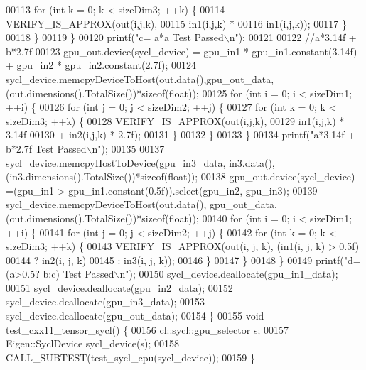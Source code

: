 \begin{DoxyCode}
00113       \textcolor{keywordflow}{for} (\textcolor{keywordtype}{int} k = 0; k < sizeDim3; ++k) \{
00114         VERIFY\_IS\_APPROX(out(i,j,k),
00115                          in1(i,j,k) *
00116                              in1(i,j,k));
00117       \}
00118     \}
00119   \}
00120   printf(\textcolor{stringliteral}{"c= a*a Test Passed\(\backslash\)n"});
00121 
00122   \textcolor{comment}{//a*3.14f + b*2.7f}
00123   gpu\_out.device(sycl\_device) =  gpu\_in1 * gpu\_in1.constant(3.14f) + gpu\_in2 * gpu\_in2.constant(2.7f);
00124   sycl\_device.memcpyDeviceToHost(out.data(),gpu\_out\_data,(out.dimensions().TotalSize())*\textcolor{keyword}{sizeof}(\textcolor{keywordtype}{float}));
00125   \textcolor{keywordflow}{for} (\textcolor{keywordtype}{int} i = 0; i < sizeDim1; ++i) \{
00126     \textcolor{keywordflow}{for} (\textcolor{keywordtype}{int} j = 0; j < sizeDim2; ++j) \{
00127       \textcolor{keywordflow}{for} (\textcolor{keywordtype}{int} k = 0; k < sizeDim3; ++k) \{
00128         VERIFY\_IS\_APPROX(out(i,j,k),
00129                          in1(i,j,k) * 3.14f
00130                        + in2(i,j,k) * 2.7f);
00131       \}
00132     \}
00133   \}
00134   printf(\textcolor{stringliteral}{"a*3.14f + b*2.7f Test Passed\(\backslash\)n"});
00135 
00137   sycl\_device.memcpyHostToDevice(gpu\_in3\_data, in3.data(),(in3.dimensions().TotalSize())*\textcolor{keyword}{sizeof}(\textcolor{keywordtype}{float}));
00138   gpu\_out.device(sycl\_device) =(gpu\_in1 > gpu\_in1.constant(0.5f)).select(gpu\_in2, gpu\_in3);
00139   sycl\_device.memcpyDeviceToHost(out.data(), gpu\_out\_data,(out.dimensions().TotalSize())*\textcolor{keyword}{sizeof}(\textcolor{keywordtype}{float}));
00140   \textcolor{keywordflow}{for} (\textcolor{keywordtype}{int} i = 0; i < sizeDim1; ++i) \{
00141     \textcolor{keywordflow}{for} (\textcolor{keywordtype}{int} j = 0; j < sizeDim2; ++j) \{
00142       \textcolor{keywordflow}{for} (\textcolor{keywordtype}{int} k = 0; k < sizeDim3; ++k) \{
00143         VERIFY\_IS\_APPROX(out(i, j, k), (in1(i, j, k) > 0.5f)
00144                                                 ? in2(i, j, k)
00145                                                 : in3(i, j, k));
00146       \}
00147     \}
00148   \}
00149   printf(\textcolor{stringliteral}{"d= (a>0.5? b:c) Test Passed\(\backslash\)n"});
00150   sycl\_device.deallocate(gpu\_in1\_data);
00151   sycl\_device.deallocate(gpu\_in2\_data);
00152   sycl\_device.deallocate(gpu\_in3\_data);
00153   sycl\_device.deallocate(gpu\_out\_data);
00154 \}
00155 \textcolor{keywordtype}{void} test\_cxx11\_tensor\_sycl() \{
00156   cl::sycl::gpu\_selector s;
00157   Eigen::SyclDevice sycl\_device(s);
00158   CALL\_SUBTEST(test\_sycl\_cpu(sycl\_device));
00159 \}
\end{DoxyCode}
